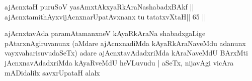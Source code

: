 \begin{shl}
ajAcnxtaH puruSoV yasAmxtAkxyaRkAraNashabadxBAkf ||
ajAcnxtamithAyxvijAcnxnarUpatAvxnanx tu tatatxvXtaH\hfill || 65 ||
\end{shl}

\begin{artha}
ajAcnxtavAda paramAtamanxneV kAyaRkAraNa shabadxgaLige
pAtarxnAgiruvanunx (aMdare ajAcnxnadiMda kAyaRkAraNaveMdu adanunx
vayxvaharisuvudaSeTx) adare ajAcnxtavAdadxriMda kAraNaveMdU BArxMti
jAcnxnavAdadxriMda kAyaRveMdU heVLuvudu | aSeTx, nijavAgi vicAra
mADidalilx savxrUpataH alalx 
\end{artha}
